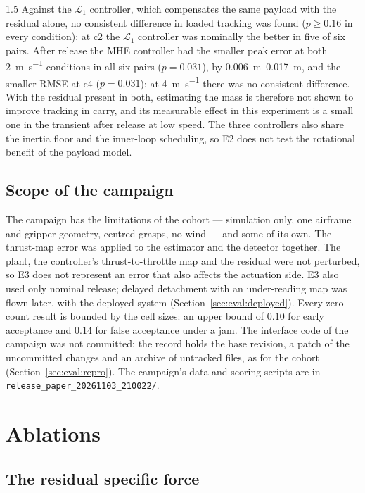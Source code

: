\begin{spacing}{1.5}
Against the $\mathcal{L}_1$ controller, which compensates the same payload with
the residual alone, no consistent difference in loaded tracking was found
($p\ge0.16$ in every condition); at c2 the $\mathcal{L}_1$ controller was
nominally the better in five of six pairs. After release the MHE controller had
the smaller peak error at both \SI{2}{\meter\per\second} conditions in all six
pairs ($p=0.031$), by \SIrange{0.006}{0.017}{\meter}, and the smaller RMSE at
c4 ($p=0.031$); at \SI{4}{\meter\per\second} there was no consistent
difference. With the residual present in both, estimating the mass is therefore
not shown to improve tracking in carry, and its measurable effect in this
experiment is a small one in the transient after release at low speed. The
three controllers also share the inertia floor and the inner-loop scheduling, so
E2 does not test the rotational benefit of the payload model.

\subsection{Scope of the campaign}\label{sec:eval:camp:limits}

The campaign has the limitations of the cohort --- simulation only, one
airframe and gripper geometry, centred grasps, no wind --- and some of its own.
The thrust-map error was applied to the estimator and the detector together.
The plant, the controller's thrust-to-throttle map and the residual were not
perturbed, so E3 does not represent an error that also affects the actuation
side. E3 also used only nominal release; delayed detachment with an
under-reading map was flown later, with the deployed system
(Section~\ref{sec:eval:deployed}). Every zero-count result is bounded by the cell sizes: an upper bound of
$0.10$ for early acceptance and $0.14$ for false acceptance under a jam. The
interface code of the campaign was not committed; the record holds the base
revision, a patch of the uncommitted changes and an archive of untracked files,
as for the cohort (Section~\ref{sec:eval:repro}). The campaign's data and scoring
scripts are in \texttt{release\_paper\_20261103\_210022/}.

\section{Ablations}\label{sec:eval:ablations}

\subsection{The residual specific force}\label{sec:eval:l1ablation}


\end{spacing}
